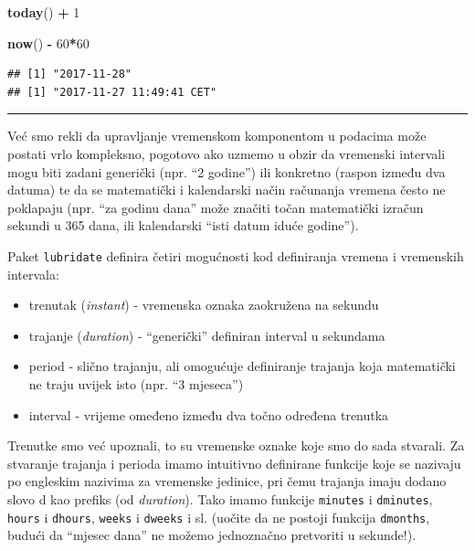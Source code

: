 \documentclass[]{book}
\newenvironment{Shaded}{\begin{snugshade}}{\end{snugshade}}
\newcommand{\KeywordTok}[1]{\textcolor[rgb]{0.13,0.29,0.53}{\textbf{#1}}}
\newcommand{\DecValTok}[1]{\textcolor[rgb]{0.00,0.00,0.81}{#1}}
\newcommand{\StringTok}[1]{\textcolor[rgb]{0.31,0.60,0.02}{#1}}
\newcommand{\OperatorTok}[1]{\textcolor[rgb]{0.81,0.36,0.00}{\textbf{#1}}}
\newcommand{\NormalTok}[1]{#1}
\providecommand{\tightlist}{%
  \setlength{\itemsep}{0pt}\setlength{\parskip}{0pt}}
\theoremstyle{definition}
\theoremstyle{definition}
\theoremstyle{definition}
\theoremstyle{remark}
\begin{document}
\begin{Shaded}
\begin{Highlighting}[]
\KeywordTok{today}\NormalTok{() }\OperatorTok{+}\StringTok{ }\DecValTok{1}

\KeywordTok{now}\NormalTok{() }\OperatorTok{-}\StringTok{ }\DecValTok{60}\OperatorTok{*}\DecValTok{60}
\end{Highlighting}
\end{Shaded}

\begin{verbatim}
## [1] "2017-11-28"
## [1] "2017-11-27 11:49:41 CET"
\end{verbatim}

\begin{center}\rule{0.5\linewidth}{\linethickness}\end{center}

Već smo rekli da upravljanje vremenskom komponentom u podacima može
postati vrlo kompleksno, pogotovo ako uzmemo u obzir da vremenski
intervali mogu biti zadani generički (npr. ``2 godine'') ili konkretno
(raspon između dva datuma) te da se matematički i kalendarski način
računanja vremena često ne poklapaju (npr. ``za godinu dana'' može
značiti točan matematički izračun sekundi u 365 dana, ili kalendarski
``isti datum iduće godine'').

Paket \texttt{lubridate} definira četiri mogućnosti kod definiranja
vremena i vremenskih intervala:

\begin{itemize}
\tightlist
\item
  trenutak (\emph{instant}) - vremenska oznaka zaokružena na sekundu
\item
  trajanje (\emph{duration}) - ``generički'' definiran interval u
  sekundama
\item
  period - slično trajanju, ali omogućuje definiranje trajanja koja
  matematički ne traju uvijek isto (npr. ``3 mjeseca'')
\item
  interval - vrijeme omeđeno između dva točno određena trenutka
\end{itemize}

Trenutke smo već upoznali, to su vremenske oznake koje smo do sada
stvarali. Za stvaranje trajanja i perioda imamo intuitivno definirane
funkcije koje se nazivaju po engleskim nazivima za vremenske jedinice,
pri čemu trajanja imaju dodano slovo d kao prefiks (od \emph{duration}).
Tako imamo funkcije \texttt{minutes} i \texttt{dminutes}, \texttt{hours}
i \texttt{dhours}, \texttt{weeks} i \texttt{dweeks} i sl. (uočite da ne
postoji funkcija \texttt{dmonths}, budući da ``mjesec dana'' ne možemo
jednoznačno pretvoriti u sekunde!).
\end{document}
